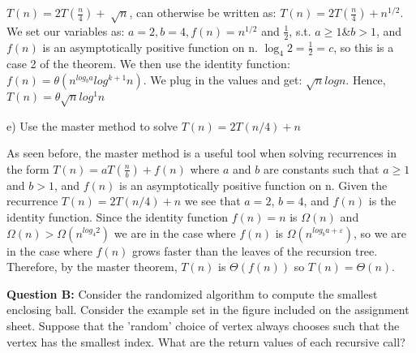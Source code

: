 \documentclass[12pt]{article}
\begin{document}
$T(n) = 2T(\frac{n}{4})+\sqrt[]{n}$, can otherwise be written as: $T(n) = 2T(\frac{n}{4})+n^{1/2}$. \\
We set our variables as: $a=2, b=4, f(n)=n^{1/2}$ and $\frac{1}{2}$, s.t. $a\geq1$\&$b>1$, and $f(n)$ is an asymptotically positive function on n. $\log_4 2 = \frac{1}{2} = c$, so this is a case 2 of the theorem. We then use the identity function: $f(n) = \theta(n^{log_ba}log^{k+1} n)$.
We plug in the values and get: $\sqrt{n}log n$. Hence, $T(n)= \theta\sqrt{n}log^1n$ 
\bigskip

e) Use the master method to solve $T(n) = 2T(n/4) + n$ \smallskip

As seen before, the master method is a useful tool when solving recurrences in the form $T(n) = aT(\frac{n}{b}) + f(n)$ where $a$ and $b$ are constants such that $a \geq 1$ and $b > 1$, and $f(n)$ is an asymptotically positive function on n. Given the recurrence $T(n) = 2T(n/4) + n$ we see that $a = 2$, $b = 4$, and $f(n)$ is the identity function. Since the identity function $f(n) = n$ is $\Omega (n)$ and $\Omega (n) > \Omega (n^{log_4 2})$ we are in the case where $f(n)$ is $\Omega (n^{log_b a + \varepsilon})$, so we are in the case where $f(n)$ grows faster than the leaves of the recursion tree. Therefore, by the master theorem, $T(n)$ is $\Theta (f(n))$ so $T(n) = \Theta (n)$. \bigskip

\noindent
\textbf{Question B:} Consider the randomized algorithm to compute the smallest enclosing ball. Consider the example set in the figure included on the assignment sheet. Suppose that the 'random' choice of vertex always chooses such that the vertex has the smallest index. What are the return values of each recursive call? \smallskip
\end{document}
